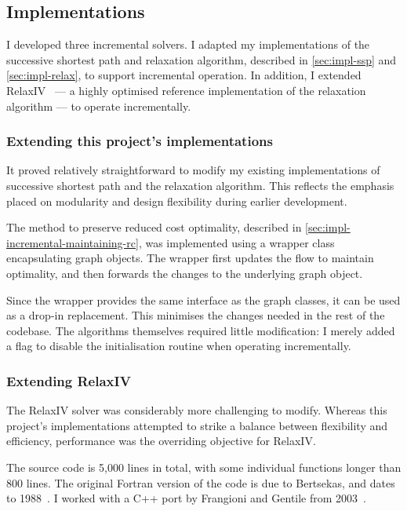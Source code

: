 \subsection{Implementations} \label{sec:impl-incremental-impl}

I developed three incremental solvers. I adapted my implementations of the successive shortest path and relaxation algorithm, described in \cref{sec:impl-ssp} and \cref{sec:impl-relax}, to support incremental operation. In addition, I extended RelaxIV~\cite{BertsekasCodes:1988,RelaxIV:2011} --- a highly optimised reference implementation of the relaxation algorithm --- to operate incrementally.

\subsubsection{Extending this project's implementations}
It proved relatively straightforward to modify my existing implementations of successive shortest path and the relaxation algorithm. This reflects the emphasis placed on modularity and design flexibility during earlier development.

The method to preserve reduced cost optimality, described in \cref{sec:impl-incremental-maintaining-rc}, was implemented using a wrapper class encapsulating graph objects. The wrapper first updates the flow to maintain optimality, and then forwards the changes to the underlying graph object.

Since the wrapper provides the same interface as the graph classes, it can be used as a drop-in replacement. This minimises the changes needed in the rest of the codebase. The algorithms themselves required little modification: I merely added a flag to disable the initialisation routine when operating incrementally.
 
\subsubsection{Extending RelaxIV}
The RelaxIV solver was considerably more challenging to modify. Whereas this project's implementations attempted to strike a balance between flexibility and efficiency, performance was the overriding objective for RelaxIV. 

The source code is 5,000 lines in total, with some individual functions longer than 800 lines. The original Fortran version of the code is due to Bertsekas, and dates to 1988~\cite{BertsekasCodes:1988}. I worked with a C++ port by Frangioni and Gentile from 2003~\cite{RelaxIV:2011}.

